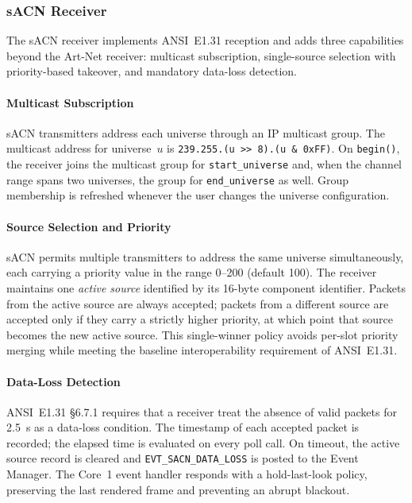 \subsubsection{sACN Receiver}
\label{sec:sacn_receiver}

The \ac{sACN} receiver implements ANSI~E1.31 reception and adds three capabilities beyond the Art-Net receiver: multicast subscription, single-source selection with priority-based takeover, and mandatory data-loss detection.

\paragraph{Multicast Subscription}
\ac{sACN} transmitters address each universe through an \ac{IP} multicast group.
The multicast address for universe~$u$ is \texttt{239.255.(u >> 8).(u \& 0xFF)}.
On \texttt{begin()}, the receiver joins the multicast group for \texttt{start\_universe} and, when the channel range spans two universes, the group for \texttt{end\_universe} as well.
Group membership is refreshed whenever the user changes the universe configuration.

\paragraph{Source Selection and Priority}
\ac{sACN} permits multiple transmitters to address the same universe simultaneously, each carrying a priority value in the range 0–200 (default 100).
The receiver maintains one \emph{active source} identified by its 16-byte component identifier.
Packets from the active source are always accepted; packets from a different source are accepted only if they carry a strictly higher priority, at which point that source becomes the new active source.
This single-winner policy avoids per-slot priority merging while meeting the baseline interoperability requirement of ANSI~E1.31.

\paragraph{Data-Loss Detection}
ANSI~E1.31 §6.7.1 requires that a receiver treat the absence of valid packets for \SI{2.5}{\second} as a data-loss condition.
The timestamp of each accepted packet is recorded; the elapsed time is evaluated on every poll call.
On timeout, the active source record is cleared and \texttt{EVT\_SACN\_DATA\_LOSS} is posted to the Event Manager.
The Core~1 event handler responds with a hold-last-look policy, preserving the last rendered frame and preventing an abrupt blackout.

